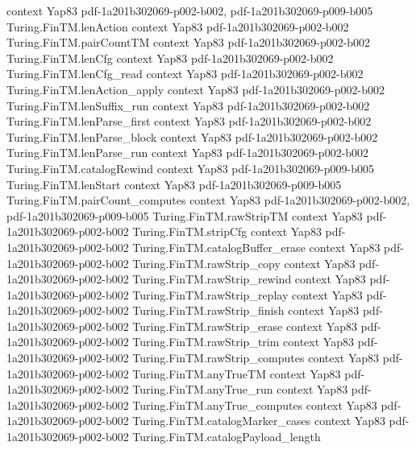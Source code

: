 \begin{theorem}
  {context}
  {Yap83}
  {pdf-1a201b302069-p002-b002,
    pdf-1a201b302069-p009-b005}
\proofstep
  {Turing.FinTM.lenAction}
  {context}
  {Yap83}
  {pdf-1a201b302069-p002-b002}
\proofstep
  {Turing.FinTM.pairCountTM}
  {context}
  {Yap83}
  {pdf-1a201b302069-p002-b002}
\proofstep
  {Turing.FinTM.lenCfg}
  {context}
  {Yap83}
  {pdf-1a201b302069-p002-b002}
\proofstep
  {Turing.FinTM.lenCfg_read}
  {context}
  {Yap83}
  {pdf-1a201b302069-p002-b002}
\proofstep
  {Turing.FinTM.lenAction_apply}
  {context}
  {Yap83}
  {pdf-1a201b302069-p002-b002}
\proofstep
  {Turing.FinTM.lenSuffix_run}
  {context}
  {Yap83}
  {pdf-1a201b302069-p002-b002}
\proofstep
  {Turing.FinTM.lenParse_first}
  {context}
  {Yap83}
  {pdf-1a201b302069-p002-b002}
\proofstep
  {Turing.FinTM.lenParse_block}
  {context}
  {Yap83}
  {pdf-1a201b302069-p002-b002}
\proofstep
  {Turing.FinTM.lenParse_run}
  {context}
  {Yap83}
  {pdf-1a201b302069-p002-b002}
\proofstep
  {Turing.FinTM.catalogRewind}
  {context}
  {Yap83}
  {pdf-1a201b302069-p009-b005}
\proofstep
  {Turing.FinTM.lenStart}
  {context}
  {Yap83}
  {pdf-1a201b302069-p009-b005}
\proofstep
  {Turing.FinTM.pairCount_computes}
  {context}
  {Yap83}
  {pdf-1a201b302069-p002-b002,
    pdf-1a201b302069-p009-b005}
\proofstep
  {Turing.FinTM.rawStripTM}
  {context}
  {Yap83}
  {pdf-1a201b302069-p002-b002}
\proofstep
  {Turing.FinTM.stripCfg}
  {context}
  {Yap83}
  {pdf-1a201b302069-p002-b002}
\proofstep
  {Turing.FinTM.catalogBuffer_erase}
  {context}
  {Yap83}
  {pdf-1a201b302069-p002-b002}
\proofstep
  {Turing.FinTM.rawStrip_copy}
  {context}
  {Yap83}
  {pdf-1a201b302069-p002-b002}
\proofstep
  {Turing.FinTM.rawStrip_rewind}
  {context}
  {Yap83}
  {pdf-1a201b302069-p002-b002}
\proofstep
  {Turing.FinTM.rawStrip_replay}
  {context}
  {Yap83}
  {pdf-1a201b302069-p002-b002}
\proofstep
  {Turing.FinTM.rawStrip_finish}
  {context}
  {Yap83}
  {pdf-1a201b302069-p002-b002}
\proofstep
  {Turing.FinTM.rawStrip_erase}
  {context}
  {Yap83}
  {pdf-1a201b302069-p002-b002}
\proofstep
  {Turing.FinTM.rawStrip_trim}
  {context}
  {Yap83}
  {pdf-1a201b302069-p002-b002}
\proofstep
  {Turing.FinTM.rawStrip_computes}
  {context}
  {Yap83}
  {pdf-1a201b302069-p002-b002}
\proofstep
  {Turing.FinTM.anyTrueTM}
  {context}
  {Yap83}
  {pdf-1a201b302069-p002-b002}
\proofstep
  {Turing.FinTM.anyTrue_run}
  {context}
  {Yap83}
  {pdf-1a201b302069-p002-b002}
\proofstep
  {Turing.FinTM.anyTrue_computes}
  {context}
  {Yap83}
  {pdf-1a201b302069-p002-b002}
\proofstep
  {Turing.FinTM.catalogMarker_cases}
  {context}
  {Yap83}
  {pdf-1a201b302069-p002-b002}
\proofstep
  {Turing.FinTM.catalogPayload_length}

\end{theorem}
